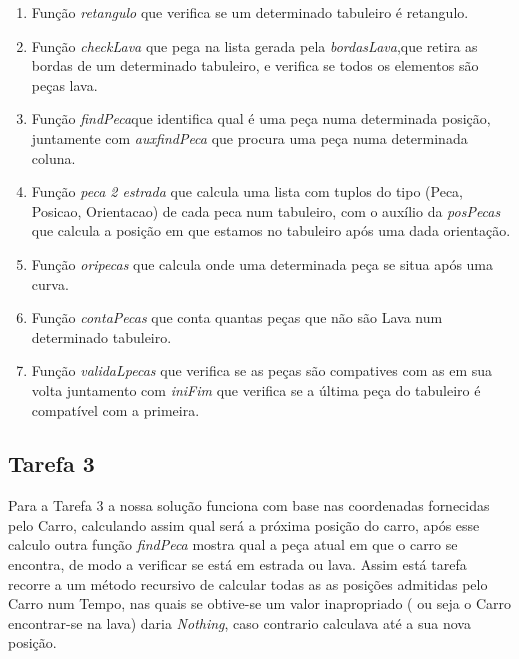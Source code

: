 \documentclass[a4paper]{report} %
\begin{document}
\begin{enumerate}
    \item Função {\color{blue}\emph{retangulo}} que verifica se um determinado tabuleiro é retangulo. 
    
    \item Função {\color{blue}\emph{checkLava}} que pega na lista gerada pela {\color{blue}\emph{bordasLava}},que retira as bordas de um determinado tabuleiro, e verifica se todos os elementos são peças lava.

    \item Função {\color{blue}\emph{findPeca}}que identifica qual é uma peça numa determinada posição, juntamente com  {\color{blue}\emph{auxfindPeca}} que procura uma peça numa determinada coluna.
    
    \item Função {\color{blue}\emph{peca 2 estrada}} que calcula uma lista com tuplos do tipo (Peca, Posicao, Orientacao) de cada peca num tabuleiro, com o auxílio da {\color{blue}\emph{posPecas}}  que  calcula a posição em que estamos no tabuleiro após uma dada orientação.
    
    \item Função {\color{blue}\emph{oripecas}} que calcula onde uma determinada peça se situa após uma curva. 
    
    \item Função {\color{blue}\emph{contaPecas}} que conta quantas peças que não são Lava num determinado tabuleiro.

    \item Função {\color{blue}\emph{validaLpecas}} que verifica se as peças são compatives com as em sua volta juntamento com {\color{blue}\emph{iniFim}} que verifica se a última peça do tabuleiro é compatível com a primeira.
    
\end{enumerate}


\subsection{Tarefa 3}
\label{subsec:solucaotarefa3}

Para a Tarefa 3 a nossa solução funciona com base nas coordenadas fornecidas pelo Carro, calculando assim qual será a próxima posição do carro, após esse calculo outra função {\color{blue}\emph{findPeca}} mostra qual a peça atual em que o carro se encontra, de modo a verificar se está em estrada ou lava. Assim está tarefa recorre a um método recursivo de calcular todas as as posições admitidas pelo Carro num Tempo, nas quais se obtive-se um valor inapropriado ( ou seja o Carro encontrar-se na lava) daria \emph{Nothing}, caso contrario calculava até a sua nova posição.
\end{document}

